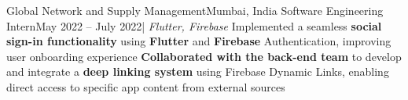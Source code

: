     \resumeSubheading
      {Global Network and Supply Management}{Mumbai, India}
      {Software Engineering Intern}{May 2022 -- July 2022}{| \textit{Flutter, Firebase}}
      \resumeItemListStart
        {Implemented a seamless \textbf{social sign-in functionality} using \textbf{Flutter} and \textbf{Firebase} Authentication, improving user onboarding experience}
        {\textbf{Collaborated with the back-end team} to develop and integrate a \textbf{deep linking system} using Firebase Dynamic Links, enabling direct access to specific app content from external sources}
      \resumeItemListEnd